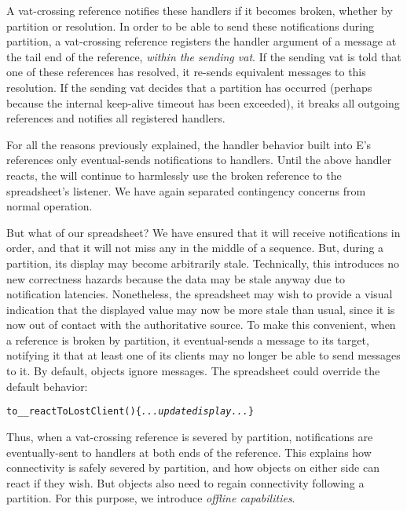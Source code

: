 \documentclass{llncs}
\begin{document}
A vat-crossing reference notifies these handlers if it becomes broken,
whether by partition or resolution. In order to be able to send these
notifications during partition, a vat-crossing reference registers the
handler argument of a  message at the tail end of
the reference, \emph{within the sending vat}. If the sending vat is
told that one of these references has resolved, it re-sends equivalent
 messages to this resolution. If the sending vat
decides that a partition has occurred (perhaps because the internal
keep-alive timeout has been exceeded), it breaks all outgoing
references and notifies all registered handlers.

For all the reasons previously explained, the handler behavior built
into E's references only eventual-sends notifications to
handlers. Until the above handler reacts, the  will
continue to harmlessly use the broken reference to the spreadsheet's
listener. We have again separated contingency concerns from normal
operation.

But what of our spreadsheet? We have ensured that it will receive
 notifications in order, and that it will not miss
any in the middle of a sequence. But, during a partition, its display
may become arbitrarily stale. Technically, this introduces no new
correctness hazards because the data may be stale anyway due to
notification latencies. Nonetheless, the spreadsheet may wish to
provide a visual indication that the displayed value may now be more
stale than usual, since it is now out of contact with the
authoritative source. To make this convenient, when a reference is
broken by partition, it eventual-sends a 
message to its target, notifying it that at least one of its clients
may no longer be able to send messages to it. By default, objects
ignore  messages. The spreadsheet could
override the default behavior:
%
\begin{alltt}
    to \_\_reactToLostClient() \{ {\it ...update display...} \}
\end{alltt}
%
Thus, when a vat-crossing reference is severed by partition,
notifications are eventually-sent to handlers at both ends of the
reference.  This explains how connectivity is safely severed by
partition, and how objects on either side can react if they wish. But
objects also need to regain connectivity following a partition. For
this purpose, we introduce \emph{offline capabilities}.
\end{document}
